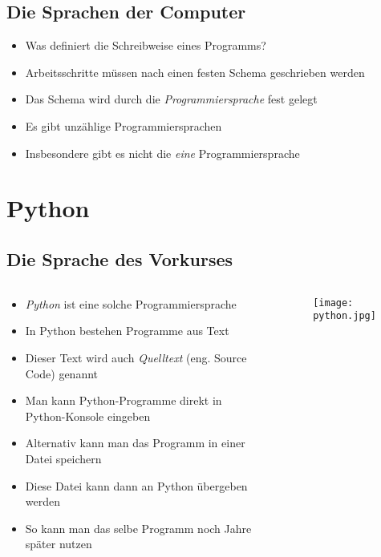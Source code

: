 \subsection{Die Sprachen der Computer}
\begin{frame}
    \slidehead
    \begin{itemize}[<+->]
        \item Was definiert die Schreibweise eines Programms?
        \item Arbeitsschritte müssen nach einen festen Schema geschrieben werden
        \item Das Schema wird durch die \emph{Programmiersprache} fest gelegt
        \item Es gibt unzählige Programmiersprachen
        \item Insbesondere gibt es nicht die \emph{eine} Programmiersprache
    \end{itemize}
\end{frame}

\section{Python}
\subsection{Die Sprache des Vorkurses}
\begin{frame}
    \slidehead
    \begin{columns}
        \begin{column}{ 0.7\textwidth }
            \begin{itemize}[<+->]
                \item \emph{Python} ist eine solche Programmiersprache
                \item In Python bestehen Programme aus Text
                \item Dieser Text wird auch \emph{Quelltext} (eng. Source Code) genannt
                \item Man kann Python-Programme direkt in Python-Konsole eingeben
                \item Alternativ kann man das Programm in einer Datei speichern
                \item Diese Datei kann dann an Python übergeben werden
                \item So kann man das selbe Programm noch Jahre später nutzen
            \end{itemize}
        \end{column}%
        \begin{column}{ 0.3\textwidth }
            \begin{figure}
                \texttt{[image: python.jpg]}
            \end{figure}
        \end{column}
    \end{columns}
\end{frame}

